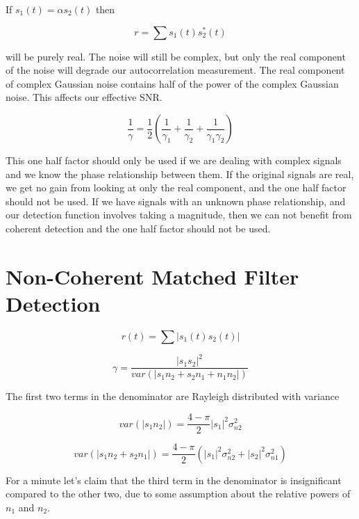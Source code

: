 \documentclass[11pt]{article}
\begin{document}
If $s_1(t) = \alpha s_2(t)$ then

\begin{equation}
r = \sum s_1(t)s^{*}_2(t)
\end{equation}

will be purely real. The noise will still be complex, but only the real component of the noise will degrade our autocorrelation measurement. The real component of complex Gaussian noise contains half of the power of the complex Gaussian noise. This affects our effective SNR.

\begin{equation}
\boxed{
\frac{1}{\gamma}
=
\frac{1}{2}
\left(
\frac{1}{\gamma_1}
+
\frac{1}{\gamma_2}
+
\frac{1}{\gamma_1 \gamma_2}
\right)
}
\end{equation}

This one half factor should only be used if we are dealing with complex signals and we know the phase relationship between them. If the original signals are real, we get no gain from looking at only the real component, and the one half factor should not be used. If we have signals with an unknown phase relationship, and our detection function involves taking a magnitude, then we can not benefit from coherent detection and the one half factor should not be used.

\section{Non-Coherent Matched Filter Detection}

\begin{equation}
r(t) = \sum |s_1(t)s_2(t)|
\end{equation}

\begin{equation}
\gamma = \frac{|s_1 s_2|^2}{var(|s_1 n_2 + s_2 n_1 + n_1 n_2|)}
\end{equation}


The first two terms in the denominator are Rayleigh distributed with variance

\begin{equation}
var(|s_1 n_2|) =
\frac{4-\pi}{2} |s_1|^2 \sigma_{n2}^2
\end{equation}


\begin{equation}
var(|s_1 n_2 + s_2 n_1|) =
\frac{4-\pi}{2}
\left(|s_1|^2 \sigma_{n2}^2 + |s_2|^2 \sigma_{n1}^2 \right)
\end{equation}

For a minute let's claim that the third term in the denominator is insignificant compared to the other two, due to some assumption about the relative powers of $n_1$ and $n_2$.
\end{document}

